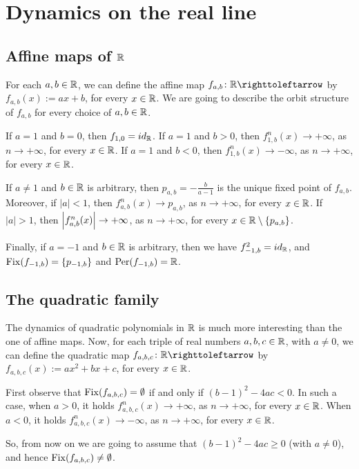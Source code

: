 \section{Dynamics on the real line}
\label{sec:real-line}

\subsection{Affine maps of $\mathbb{R}$}
\label{sec:affine-maps-R}

For each $a,b\in\mathbb{R}$, we can define the affine map $f_{a,b}\colon\R\carr$ by $f_{a,b}(x):=ax+b$, for every $x\in\mathbb{R}$. We are going to describe the orbit structure of $f_{a,b}$ for every choice of $a,b\in\mathbb{R}$.

If $a=1$ and $b=0$, then $f_{1,0}=id_{\mathbb{R}}$. If $a=1$ and $b>0$, then $f_{1,b}^n(x)\to+\infty$, as $n\to+\infty$, for every $x\in\mathbb{R}$. If $a=1$ and $b<0$, then $f_{1,b}^n(x)\to-\infty$, as $n\to+\infty$, for every $x\in\mathbb{R}$.

If $a\neq 1$ and $b\in\mathbb{R}$ is arbitrary, then $p_{a,b}=-\frac{b}{a-1}$ is the unique fixed point of $f_{a,b}$. Moreover, if $|a|<1$, then $f_{a,b}^n(x)\to p_{a,b}$, as $n\to+\infty$, for every $x\in\mathbb{R}$. If $|a|>1$, then $\left\lvert{f_{a,b}^n(x)}\right\rvert\to+\infty$, as $n\to+\infty$, for every $x\in\mathbb{R}\setminus\{p_{a,b}\}$.

Finally, if $a=-1$ and $b\in\mathbb{R}$ is arbitrary, then we have $f_{-1,b}^2=id_{\mathbb{R}}$, and $\operatorname{Fix}(f_{-1,b})=\{p_{-1,b}\}$ and $\operatorname{Per}(f_{-1,b})=\mathbb{R}$.

\subsection{The quadratic family}
\label{sec:quadratic-family}

The dynamics of quadratic polynomials in $\mathbb{R}$ is much more interesting than the one of affine maps. Now, for each triple of real numbers $a,b,c\in\mathbb{R}$, with $a\neq 0$, we can define the quadratic map $f_{a,b,c}\colon\R\carr$ by $f_{a,b,c}(x):=ax^{2}+bx+c$, for every $x\in\mathbb{R}$.

First observe that $\operatorname{Fix}(f_{a,b,c})=\emptyset$ if and only if $(b-1)^2-4ac<0$. In such a case, when $a>0$, it holds $f_{a,b,c}^n(x)\to+\infty$, as $n\to+\infty$, for every $x\in\mathbb{R}$. When $a<0$, it holds $f_{a,b,c}^n(x)\to-\infty$, as $n\to+\infty$, for every $x\in\mathbb{R}$.

So, from now on we are going to assume that $(b-1)^2-4ac\geq 0$ (with $a\neq 0$), and hence $\operatorname{Fix}(f_{a,b,c})\neq\emptyset$.


